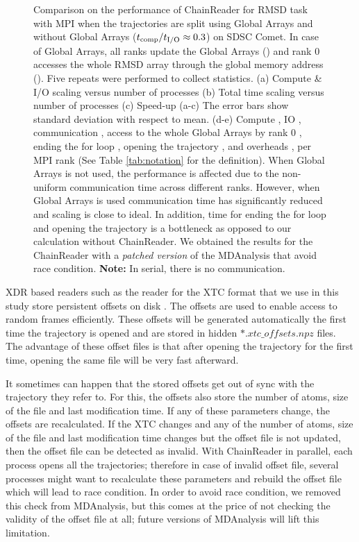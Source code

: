 \begin{figure}[ht!]
\caption{Comparison on the performance of ChainReader for RMSD task with MPI when the trajectories are split using Global Arrays and without Global Arrays (${t}_{\text{comp}}/{t}_{\text{I/O}} \approx 0.3$) on SDSC Comet.
In case of Global Arrays, all ranks update the Global Arrays () and rank 0 accesses the whole RMSD array through the global memory address ().
Five repeats were performed to collect statistics. (a) Compute \& I/O scaling versus number of processes (b) Total time scaling versus number of processes (c) Speed-up (a-c) The error bars show standard deviation with respect to mean. (d-e) Compute \tcomp, IO \tIO, communication \tcomm, access to the whole Global Arrays by rank 0 , ending the for loop ,
  opening the trajectory , and overheads ,  per MPI rank (See Table \ref{tab:notation} for the definition). When Global Arrays is not used, the performance is affected due to the non-uniform communication time across different ranks. However, when Global Arrays is used communication time has significantly reduced and scaling is close to ideal. In addition, time for ending the for loop  and 
opening the trajectory  is a bottleneck as opposed to our calculation without ChainReader. We obtained the results for the ChainReader with a \emph{patched version} of the MDAnalysis that avoid race condition. \textbf{Note:} In serial, there is no communication.}
\label{fig:MPIwithIO-split-chain-reader}
\end{figure}

XDR based readers such as the reader for the XTC format that we use in this study store persistent offsets on disk \citep{Gowers:2016aa}. 
The offsets are used to enable access to random frames efficiently. 
These offsets will be generated automatically the first time the trajectory is opened and are stored in hidden $\ast.xtc\_offsets.npz$ files. 
The advantage of these offset files is that after opening the trajectory for the first time, opening the same file will be very fast afterward. 

It sometimes can happen that the stored offsets get out of sync with the trajectory they refer to. 
For this, the offsets also store the number of atoms, size of the file and last modification time. 
If any of these parameters change, the offsets are recalculated. 
If the XTC changes and any of the number of atoms, size of the file and last modification time changes but the offset file is not updated, then the offset file can be detected as invalid.
With ChainReader in parallel, each process opens all the trajectories; therefore in case of invalid offset file, several processes might want to recalculate these parameters and rebuild the offset file which will lead to race condition.
In order to avoid race condition, we removed this check from MDAnalysis, but this comes at the price of not checking the validity of the offset file at all; future versions of MDAnalysis will lift this limitation.
 
